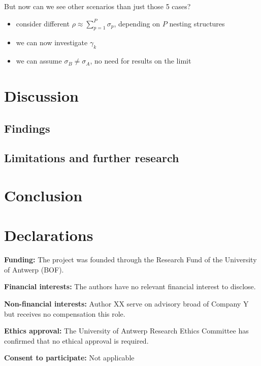 \documentclass[
  authoryear,
  preprint,
  1p]{elsarticle}
\providecommand{\tightlist}{%
  \setlength{\itemsep}{0pt}\setlength{\parskip}{0pt}}\usepackage{longtable,booktabs,array}
\begin{document}
But now can we see other scenarios than just those 5 cases?

\begin{itemize}
\tightlist
\item
  consider different \(\rho \approx \sum_{p=1}^{P} \sigma_{p}\),
  depending on \(P\) nesting structures
\item
  we can now investigate \(\gamma_{k}\)
\item
  we can assume \(\sigma_{B} \neq \sigma_{A}\), no need for results on
  the limit
\end{itemize}

\section{Discussion}\label{sec-discuss}

\subsection{Findings}\label{sec-discuss-finding}

\subsection{Limitations and further
research}\label{sec-discuss-limitations}

\section{Conclusion}\label{sec-conclusion}

\newpage{}

\section*{Declarations}\label{declarations}

\textbf{Funding:} The project was founded through the Research Fund of
the University of Antwerp (BOF).

\textbf{Financial interests:} The authors have no relevant financial
interest to disclose.

\textbf{Non-financial interests:} Author XX serve on advisory broad of
Company Y but receives no compensation this role.

\textbf{Ethics approval:} The University of Antwerp Research Ethics
Committee has confirmed that no ethical approval is required.

\textbf{Consent to participate:} Not applicable
\end{document}
